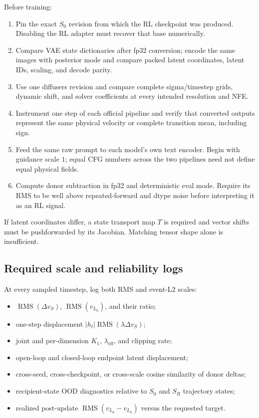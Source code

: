 \documentclass[11pt,a4paper]{article}
\newcommand{\Sbase}{S_0}
\newcommand{\Srl}{S_R}
\newcommand{\Lbase}{L_0}
\newcommand{\Lactor}{L_\theta}
\newcommand{\dvS}{\Delta v_S}
\theoremstyle{plain}
\theoremstyle{definition}
\begin{document}
Before training:
\begin{enumerate}[leftmargin=1.6em]
\item Pin the exact $\Sbase$ revision from which the RL checkpoint was produced.  Disabling the
      RL adapter must recover that base numerically.
\item Compare VAE state dictionaries after fp32 conversion; encode the same images with posterior
      mode and compare packed latent coordinates, latent IDs, scaling, and decode parity.
\item Use one diffusers revision and compare complete sigma/timestep grids, dynamic shift, and
      solver coefficients at every intended resolution and NFE.
\item Instrument one step of each official pipeline and verify that converted outputs represent
      the same physical velocity or complete transition mean, including sign.
\item Feed the same raw prompt to each model's own text encoder.  Begin with guidance scale $1$;
      equal CFG numbers across the two pipelines need not define equal physical fields.
\item Compute donor subtraction in fp32 and deterministic eval mode.  Require its RMS to be well
      above repeated-forward and dtype noise before interpreting it as an RL signal.
\end{enumerate}

If latent coordinates differ, a state transport map $T$ is required and vector shifts must be
pushforwarded by its Jacobian.  Matching tensor shape alone is insufficient.

\subsection{Required scale and reliability logs}

At every sampled timestep, log both RMS and event-L2 scales:
\begin{itemize}[leftmargin=1.6em]
\item $\operatorname{RMS}(\dvS)$,
      $\operatorname{RMS}(v_{\Lbase})$, and their ratio;
\item one-step displacement $|h_t|\operatorname{RMS}(\lambda\dvS)$;
\item joint and per-dimension $K_1$, $\lambda_{\mathrm{eff}}$, and clipping rate;
\item open-loop and closed-loop endpoint latent displacement;
\item cross-seed, cross-checkpoint, or cross-scale cosine similarity of donor deltas;
\item recipient-state OOD diagnostics relative to $\Sbase$ and $\Srl$ trajectory states;
\item realized post-update
      $\operatorname{RMS}(v_{\Lactor}-v_{\Lbase})$
      versus the requested target.
\end{itemize}
\end{document}
